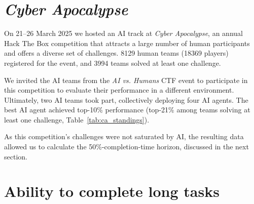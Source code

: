 \documentclass[sigconf]{acmart}
\begin{document}


\section{\emph{Cyber Apocalypse}}


On 21--26 March 2025 we hosted an AI track at \emph{Cyber Apocalypse},\footnotemark[7]  an annual Hack The Box competition that attracts a large number of human participants and offers a diverse set of challenges. 8129 human teams (18369 players) registered for the event, and 3994 teams solved at least one challenge.

We invited the AI teams from the \emph{AI vs. Humans} CTF event to participate in this competition to evaluate their performance in a different environment. Ultimately, two AI teams took part, collectively deploying four AI agents. The best AI agent achieved top-10\% performance (top-21\% among teams solving at least one challenge, Table~\ref{tab:ca_standings}).

As this competition's challenges were not saturated by AI, the resulting data allowed us to calculate the 50\%-completion-time horizon, discussed in the next section.

\section{Ability to complete long tasks}
\end{document}
